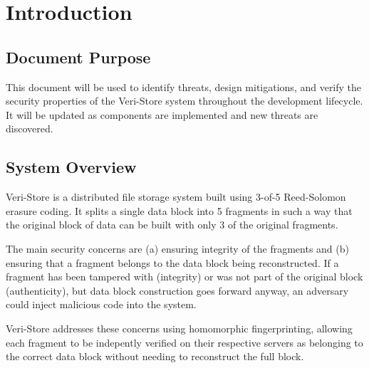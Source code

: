 \documentclass[../veristore_security_model.tex]{subfiles}
\begin{document}
\section{Introduction}

\subsection{Document Purpose}

This document will be used to identify threats, design mitigations, and verify the security properties of the Veri-Store system throughout the development lifecycle. It will be updated as components are implemented and new threats are discovered. 

\subsection{System Overview}

Veri-Store is a distributed file storage system built using 3-of-5 Reed-Solomon erasure coding. It splits a single data block into 5 fragments in such a way that the original block of data can be built with only 3 of the original fragments. 

The main security concerns are (a) ensuring integrity of the fragments and (b) ensuring that a fragment belongs to the data block being reconstructed. If a fragment has been tampered with (integrity) or was not part of the original block (authenticity), but data block construction goes forward anyway, an adversary could inject malicious code into the system.

Veri-Store addresses these concerns using homomorphic fingerprinting, allowing each fragment to be indepently verified on their respective servers as belonging to the correct data block without needing to reconstruct the full block.

\newpage
\end{document}
